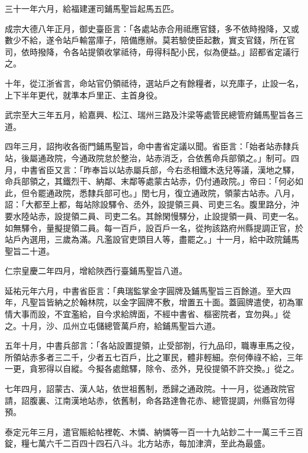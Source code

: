 \begin{pinyinscope}
 三十一年六月，給福建運司鋪馬聖旨起馬五匹。



 成宗大德八年正月，御史臺臣言：「各處站赤合用祗應官錢，多不依時撥降，又或數少不給，遂令站戶輸當庫子，陪備應辦。莫若驗使臣起數，實支官錢，所在官司，依時撥降，令各站提領收掌祗待，毋得科配小民，似為便益。」詔都省定議行之。



 十年，從江浙省言，命站官仍領祗待，選站戶之有餘糧者，以充庫子，止設一名，上下半年更代，就準本戶里正、主首身役。



 武宗至大三年五月，給嘉興、松江、瑞州三路及汴梁等處管民總管府鋪馬聖旨各三道。



 四年三月，詔拘收各衙門鋪馬聖旨，命中書省定議以聞。省臣言：「始者站赤隸兵站，後屬通政院，今通政院怠於整治，站赤消乏，合依舊命兵部領之。」制可。四月，中書省臣又言：「昨奉旨以站赤屬兵部，今右丞相鐵木迭兒等議，漢地之驛，命兵部領之，其鐵烈干、納鄰、末鄰等處蒙古站赤，仍付通政院。」帝曰：「何必如此，但令罷通政院，悉隸兵部可也。」閏七月，復立通政院，領蒙古站赤。八月，詔：「大都至上都，每站除設驛令、丞外，設提領三員、司吏三名。腹里路分，沖要水陸站赤，設提領二員、司吏二名。其餘閑慢驛分，止設提領一員、司吏一名。如無驛令，量擬提領二員。每一百戶，設百戶一名，從拘該路府州縣提調正官，於站戶內選用，三歲為滿。凡濫設官吏頭目人等，盡罷之。」十一月，給中政院鋪馬聖旨二十道。



 仁宗皇慶二年四月，增給陜西行臺鋪馬聖旨八道。



 延祐元年六月，中書省臣言：「典瑞監掌金字圓牌及鋪馬聖旨三百餘道。至大四年，凡聖旨皆納之於翰林院，以金字圓牌不敷，增置五十面。蓋圓牌遣使，初為軍情大事而設，不宜濫給，自今求給牌面，不經中書省、樞密院者，宜勿與。」從之。十月，沙、瓜州立屯儲總管萬戶府，給鋪馬聖旨六道。



 五年十月，中書兵部言：「各站設置提領，止受部劄，行九品印，職專車馬之役，所領站赤多者三二千，少者五七百戶，比之軍民，體非輕細。奈何俸祿不給，三年一更，貪邪得以自縱。今擬各處館驛，除令、丞外，見役提領不許交換。」從之。



 七年四月，詔蒙古、漢人站，依世祖舊制，悉歸之通政院。十一月，從通政院官請，詔腹裏、江南漢地站赤，依舊制，命各路達魯花赤、總管提調，州縣官勿得預。



 泰定元年三月，遣官賑給帖裡乾、木憐、納憐等一百一十九站鈔二十一萬三千三百錠，糧七萬六千二百四十四石八斗。北方站赤，每加津濟，至此為最盛。




\end{pinyinscope}
